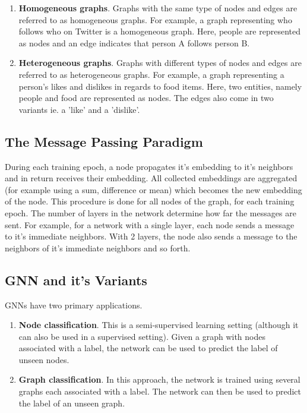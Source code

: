 \begin{enumerate}
\item \textbf{Homogeneous graphs}. Graphs with the same type of nodes
  and edges are referred to as homogeneous graphs. For example, a
  graph representing who follows who on Twitter is a homogeneous
  graph. Here, people are represented as nodes and an edge indicates
  that person A follows person B.
\item \textbf{Heterogeneous graphs}. Graphs with different types of
  nodes and edges are referred to as heterogeneous graphs. For
  example, a graph representing a person's likes and dislikes in
  regards to food items. Here, two entities, namely people and food
  are represented as nodes. The edges also come in two variants ie. a
  'like' and a 'dislike'.
\end{enumerate}

\subsection{The Message Passing Paradigm}

During each training epoch, a node propagates it's embedding to it's
neighbors and in return receives their embedding. All collected
embeddings are aggregated (for example using a sum, difference or
mean) which becomes the new embedding of the node. This procedure is
done for all nodes of the graph, for each training epoch. The number
of layers in the network determine how far the messages are sent. For
example, for a network with a single layer, each node sends a message
to it's immediate neighbors. With 2 layers, the node also sends a
message to the neighbors of it's immediate neighbors and so forth.

\subsection{GNN and it's Variants}

GNNs have two primary applications.

\begin{enumerate}
\item \textbf{Node classification}. This is a semi-supervised learning
  setting (although it can also be used in a supervised setting).
  Given a graph with nodes associated with a label, the network can be
  used to predict the label of unseen nodes.
\item \textbf{Graph classification}. In this approach, the network is
  trained using several graphs each associated with a label. The
  network can then be used to predict the label of an unseen graph.
\end{enumerate}


